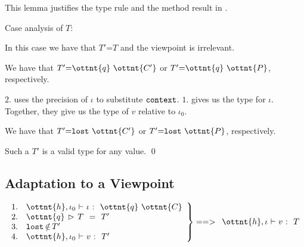 \noindent
This lemma justifies the type rule  and the
method result in .

Case analysis of $T$:


In this case we have that $T'  \textsf{=}  T$ and the viewpoint is
irrelevant.




We have that $T'  \textsf{=}    \ottnt{q} \  \ottnt{C'}  $ or $T'  \textsf{=}    \ottnt{q} \  \ottnt{P}  $, respectively.

$2.$ uses the precision of $\iota$ to substitute $ \texttt{\upshape{context}\,\!} $.
$1.$ gives us the type for $\iota$.
Together, they give us the type of $v$ relative to $\iota_{{\mathrm{0}}}$.


We have that $T'  \textsf{=}     \texttt{\upshape{lost}\,\!}  \  \ottnt{C'}  $ or $T'  \textsf{=}     \texttt{\upshape{lost}\,\!}  \  \ottnt{P}  $, respectively.

Such a $T'$ is a valid type for any value.
\qed




\subsection{Adaptation to a Viewpoint}

\begin{lemma}
\label{lemma:decomp}
\[
\left.
\begin{array}{ll}
1. &  \ottnt{h} ,  \iota_{{\mathrm{0}}} \  \textsf{$\vdash$} \  \iota \  \textsf{:} \ \    \ottnt{q} \  \ottnt{C}   \\
2. &  \ottnt{q} \, \rhd\,  T \ \  \textsf{=} \ \  T' \\
3. &  \texttt{\upshape{lost}\,\!}  \, \textsf{$\notin$} \, T'\\
4. &  \ottnt{h} ,  \iota_{{\mathrm{0}}} \  \textsf{$\vdash$} \  v \  \textsf{:} \ \  T' \\
\end{array}
\right\} ==>
\begin{array}{l}
 \ottnt{h} ,  \iota \  \textsf{$\vdash$} \  v \  \textsf{:} \ \  T 
\end{array}
\]
\end{lemma}

